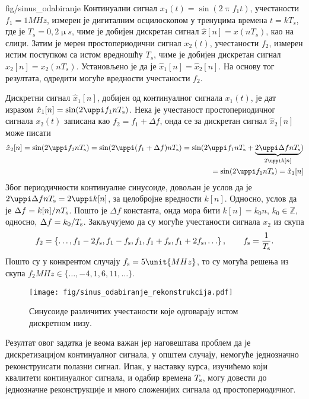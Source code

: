 \noindent\mnImportant
\begin{slikaDesno}{fig/sinus_odabiranje}
    \PID Континуални сигнал $x_1(t) = \sin(2\uppi f_1 t)$, учестаности $f_1 = 1\unit{MHz}$, измерен је 
    дигиталним осцилоскопом у тренуцима времена
    $t = kT_s$, где је ${T_s = 0,2\unit{\upmu s}}$, чиме је добијен дискретан сигнал $\hat x[n] = x(nT_s)$, као на слици.
    Затим је мерен простопериодични сигнал $x_2(t)$, учестаности $f_2$, измерен истим поступком 
    са истом вредношћу $T_s$, чиме је добијен дискретан сигнал $\hat x_2[n] = x_2(nT_s)$. 
    Установљено је да је $\hat x_1[n] = \hat x_2[n]$. 
    На основу тог резултата, одредити могуће вредности учестаности $f_2$.
\end{slikaDesno}

\RESENJE 
Дискретни сигнал $\hat x_1[n]$, добијен од континуалног сигнала $x_1(t)$, је дат изразом 
$
\hat x_1[n] = \sin(2\uppi f_1 n T_{\rm s}) 
$. Нека је учестаност простопериодичног сигнала $x_2(t)$ записана као $f_2 = f_1 + \Delta f$, онда се за дискретан сигнал 
$\hat x_2[n]$ може писати
\begin{eqnarray}
    \hat x_2[n] = \sin(2\uppi f_2 nT_{\rm s}) = \sin(2\uppi (f_1 + \Delta f) nT_{\rm s}) 
    = \sin(2\uppi f_1 n T_{\rm s} + \underbrace{2\uppi \Delta f n T_{\rm s}}_{2\uppi k[n]}  ) \\
    = \sin(2\uppi f_1 n T_{\rm s}) = \hat x_1[n]
\end{eqnarray}
Због периодичности континуалне синусоиде, довољан је услов да је $2\uppi \Delta f n T_{\rm s} = 2\uppi k[n]$, за целобројне вредности $k[n]$.
Односно, услов да је $\Delta f = k[n]/nT_{\rm s}$. Пошто је $\Delta f$ константа, онда мора бити $k[n] = k_0 n$, 
$k_0 \in \mathbb Z$, односно, $\Delta f = k_0/T_{\rm s}$. Закључујемо да су  могуће учестаности сигнала $x_2$
из скупа
\begin{eqnarray}
    f_2 = \left\{
    \ldots,
    f_1 - 2 f_{\rm s},
    f_1 - f_{\rm s},
    f_1,
    f_1 + f_{\rm s},
    f_1 + 2 f_{\rm s},
    \ldots
    \right\}, \qquad f_{\rm s} = \dfrac{1}{T_{\rm s}}.
\end{eqnarray}
Пошто су у конкрентом случају $f_{\rm s} = 5\unit{MHz}$, то су могућа решења из скупа
$f_2\unit{MHz} \in \{\ldots, -4 ,1, 6, 11, \ldots\}$.

\begin{figure}[ht!]
    \texttt{[image: fig/sinus\_odabiranje\_rekonstrukcija.pdf]}
    \caption{Синусоиде различитих учестаности које одговарају истом дискретном низу.}
\end{figure}

Резултат овог задатка је веома важан јер наговештава проблем да је дискретизацијом 
континуалног сигнала, у општем случају, 
немогуће једнозначно реконструисати полазни сигнал. Ипак, у наставку курса, изучићемо који квалитети 
континуалног сигнала, и одабир времена $T_{\rm s}$, могу довести до једнозначне реконструкције
и много сложенијих сигнала од простопериодичног.  